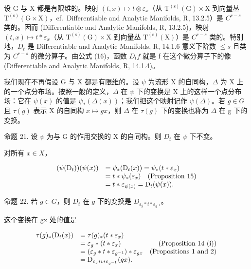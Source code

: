 设 G 与 X 都是有限维的。映射 \((t, x) \mapsto t \otimes \varepsilon_{x}\)（从 \(\mathrm{T}^{(\mathrm{s})}(\mathrm{G}) \times \mathrm{X}\) 到向量丛 \(\mathrm{T}^{(\mathrm{s})}(\mathrm{G} \times \mathrm{X})\)，cf.~Differentiable and Analytic Manifolds, R, 13.2.5）是 \(C^{r-s}\) 类的。因而 (Differentiable and Analytic Manifolds, R, 13.2.5)，映射 \((t, x) \mapsto t * \varepsilon_{x}\)（从 \(\mathrm{T}^{(\mathrm{s})}(\mathrm{G}) \times \mathrm{X}\) 到向量丛 \(\mathrm{T}^{(\mathrm{s})}(\mathrm{X})\)）是 \(C^{r-s}\) 类的。特别地，\(D_{t}\) 是 Differentiable and Analytic Manifolds, R, 14.1.6 意义下阶数 \(\leqslant s\) 且类为 \(C^{r-s}\) 的微分算子。由公式 (16)，函数 \(D_{t}f\) 就是 f 在这个微分算子下的像 (Differentiable and Analytic Manifolds, R, 14.1.4)。

我们现在不再假设 G 与 X 都是有限维的。设 \(\psi\) 为流形 X 的自同构，\(\Delta\) 为 X 上的一个点分布场。按照一般的定义，\(\Delta\) 在 \(\psi\) 下的变换是 X 上的这样一个点分布场：它在 \(\psi(x)\) 的值是 \(\psi_{*}(\Delta(x))\)；我们把这个映射记作 \(\psi(\Delta)\)。若 \(g \in G\) 且 \(\tau(g)\) 表示 X 的自同构 \(x \mapsto gx\)，则 \(\Delta\) 在 \(\tau(g)\) 下的变换也称为 \(\Delta\) 在 g 下的变换。

命题 21. 设 \(\psi\) 为与 G 的作用交换的 X 的自同构。则 \(D_{t}\) 在 \(\psi\) 下不变。

对所有 \(x \in X\)，

\[
\begin{array}{r l} (\psi (\mathrm{D} _ {t})) (\psi (x)) & = \psi_ {*} (\mathrm{D} _ {t} (x)) = \psi_ {*} (t * \varepsilon_ {x}) \\ & = t * \psi_ {*} (\varepsilon_ {x}) \quad \text {(Proposition 15)} \\ & = t * \varepsilon_ {\psi (x)} = \mathrm{D} _ {t} (\psi (x)). \end{array}
\]

命题 22. 若 \(g \in G\)，则 \(D_t\) 在 \(g\) 下的变换是 \(D_{\varepsilon_g * t * \varepsilon_{g^{-1}}}\)。

这个变换在 gx 处的值是

\[
\begin{array}{r l r} \tau (g) _ {*} (\mathrm{D} _ {t} (x)) & = \tau (g) _ {*} (t * \varepsilon_ {x}) \\ & = \varepsilon_ {g} * (t * \varepsilon_ {x}) & \text {(Proposition 14 (i))} \\ & = (\varepsilon_ {g} * t * \varepsilon_ {g^{-1}}) * \varepsilon_ {g x} & \text {(Propositions 1 and 2)} \\ & = \mathrm{D} _ {\varepsilon_ {g} * t * \varepsilon_ {g^{-1}}} (g x). \end{array}
\]

